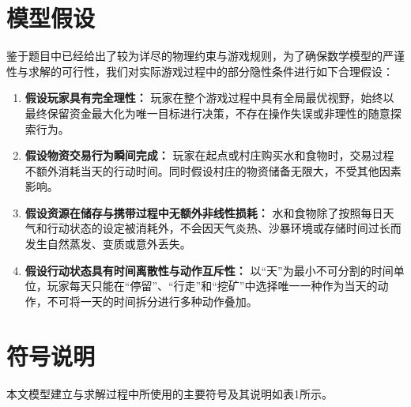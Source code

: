 \documentclass[UTF8,a4paper,12pt]{ctexart}
\begin{document}
\section{模型假设}
鉴于题目中已经给出了较为详尽的物理约束与游戏规则，为了确保数学模型的严谨性与求解的可行性，我们对实际游戏过程中的部分隐性条件进行如下合理假设：

\begin{enumerate}
    \item \textbf{假设玩家具有完全理性：} 玩家在整个游戏过程中具有全局最优视野，始终以最终保留资金最大化为唯一目标进行决策，不存在操作失误或非理性的随意探索行为。
    \item \textbf{假设物资交易行为瞬间完成：} 玩家在起点或村庄购买水和食物时，交易过程不额外消耗当天的行动时间。同时假设村庄的物资储备无限大，不受其他因素影响。
    \item \textbf{假设资源在储存与携带过程中无额外非线性损耗：} 水和食物除了按照每日天气和行动状态的设定被消耗外，不会因天气炎热、沙暴环境或存储时间过长而发生自然蒸发、变质或意外丢失。
    \item \textbf{假设行动状态具有时间离散性与动作互斥性：} 以“天”为最小不可分割的时间单位，玩家每天只能在“停留”、“行走”和“挖矿”中选择唯一一种作为当天的动作，不可将一天的时间拆分进行多种动作叠加。
\end{enumerate}



\section{符号说明}
本文模型建立与求解过程中所使用的主要符号及其说明如表1所示。
\end{document}
